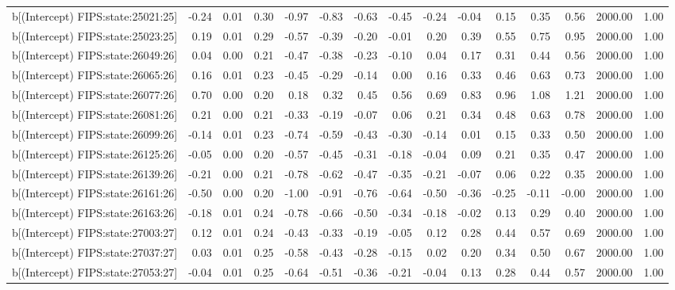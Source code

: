 \begin{table}[ht]
\begin{tabular}{rrrrrrrrrrrrrrr}
  b[(Intercept) FIPS:state:25021:25] & -0.24 & 0.01 & 0.30 & -0.97 & -0.83 & -0.63 & -0.45 & -0.24 & -0.04 & 0.15 & 0.35 & 0.56 & 2000.00 & 1.00 \\ 
  b[(Intercept) FIPS:state:25023:25] & 0.19 & 0.01 & 0.29 & -0.57 & -0.39 & -0.20 & -0.01 & 0.20 & 0.39 & 0.55 & 0.75 & 0.95 & 2000.00 & 1.00 \\ 
  b[(Intercept) FIPS:state:26049:26] & 0.04 & 0.00 & 0.21 & -0.47 & -0.38 & -0.23 & -0.10 & 0.04 & 0.17 & 0.31 & 0.44 & 0.56 & 2000.00 & 1.00 \\ 
  b[(Intercept) FIPS:state:26065:26] & 0.16 & 0.01 & 0.23 & -0.45 & -0.29 & -0.14 & 0.00 & 0.16 & 0.33 & 0.46 & 0.63 & 0.73 & 2000.00 & 1.00 \\ 
  b[(Intercept) FIPS:state:26077:26] & 0.70 & 0.00 & 0.20 & 0.18 & 0.32 & 0.45 & 0.56 & 0.69 & 0.83 & 0.96 & 1.08 & 1.21 & 2000.00 & 1.00 \\ 
  b[(Intercept) FIPS:state:26081:26] & 0.21 & 0.00 & 0.21 & -0.33 & -0.19 & -0.07 & 0.06 & 0.21 & 0.34 & 0.48 & 0.63 & 0.78 & 2000.00 & 1.00 \\ 
  b[(Intercept) FIPS:state:26099:26] & -0.14 & 0.01 & 0.23 & -0.74 & -0.59 & -0.43 & -0.30 & -0.14 & 0.01 & 0.15 & 0.33 & 0.50 & 2000.00 & 1.00 \\ 
  b[(Intercept) FIPS:state:26125:26] & -0.05 & 0.00 & 0.20 & -0.57 & -0.45 & -0.31 & -0.18 & -0.04 & 0.09 & 0.21 & 0.35 & 0.47 & 2000.00 & 1.00 \\ 
  b[(Intercept) FIPS:state:26139:26] & -0.21 & 0.00 & 0.21 & -0.78 & -0.62 & -0.47 & -0.35 & -0.21 & -0.07 & 0.06 & 0.22 & 0.35 & 2000.00 & 1.00 \\ 
  b[(Intercept) FIPS:state:26161:26] & -0.50 & 0.00 & 0.20 & -1.00 & -0.91 & -0.76 & -0.64 & -0.50 & -0.36 & -0.25 & -0.11 & -0.00 & 2000.00 & 1.00 \\ 
  b[(Intercept) FIPS:state:26163:26] & -0.18 & 0.01 & 0.24 & -0.78 & -0.66 & -0.50 & -0.34 & -0.18 & -0.02 & 0.13 & 0.29 & 0.40 & 2000.00 & 1.00 \\ 
  b[(Intercept) FIPS:state:27003:27] & 0.12 & 0.01 & 0.24 & -0.43 & -0.33 & -0.19 & -0.05 & 0.12 & 0.28 & 0.44 & 0.57 & 0.69 & 2000.00 & 1.00 \\ 
  b[(Intercept) FIPS:state:27037:27] & 0.03 & 0.01 & 0.25 & -0.58 & -0.43 & -0.28 & -0.15 & 0.02 & 0.20 & 0.34 & 0.50 & 0.67 & 2000.00 & 1.00 \\ 
  b[(Intercept) FIPS:state:27053:27] & -0.04 & 0.01 & 0.25 & -0.64 & -0.51 & -0.36 & -0.21 & -0.04 & 0.13 & 0.28 & 0.44 & 0.57 & 2000.00 & 1.00 \\ 

\end{tabular}
\end{table}

